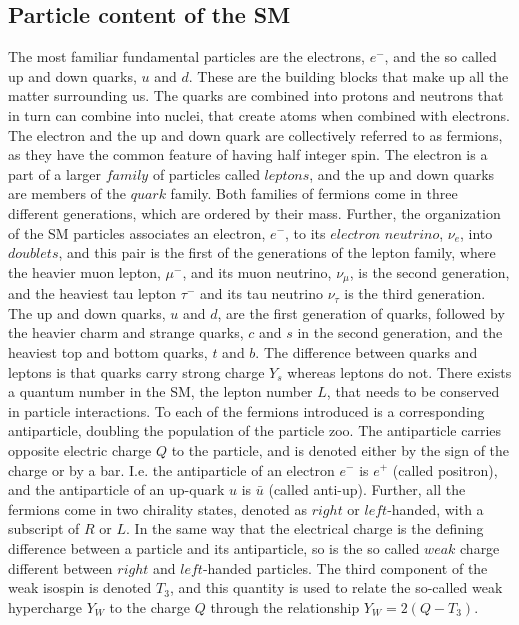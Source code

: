 \subsection*{Particle content of the SM}  
\noindent\justify
The most familiar fundamental particles are the electrons, $e^{-}$, and the so called up and down quarks, $u$ and $d$. 
These are the building blocks that make up all the matter surrounding us. 
The quarks are combined into protons and neutrons that in turn can combine into nuclei, that create atoms when combined with electrons. 
The electron and the up and down quark are collectively referred to as fermions, as they have the common feature of having half integer spin. 
The electron is a part of a larger $family$ of particles called $leptons$, and the up and down quarks are members of the $quark$ family.
Both families of fermions come in three different generations, which are ordered by their mass. 
Further, the organization of the SM particles associates an electron, $e^{-}$, to its $electron$ $neutrino$, $\nu_{e}$, into $doublets$, and this pair is the first of the generations of the lepton family, where the heavier muon lepton, $\mu^{-}$, and its muon neutrino, $\nu_{\mu}$, is the second generation, and the heaviest tau lepton $\tau^{-}$ and its tau neutrino $\nu_{\tau}$ is the third generation.  
The up and down quarks, $u$ and $d$, are the first generation of quarks, followed by the heavier charm and strange quarks, $c$ and $s$ in the second generation, and the heaviest top and bottom quarks, $t$ and $b$. 
The difference between quarks and leptons is that quarks carry strong charge $Y_{s}$ whereas leptons do not.
There exists a quantum number in the SM, the lepton number $L$, that needs to be conserved in particle interactions.
To each of the fermions introduced is a corresponding antiparticle, doubling the population of the particle zoo. 
The antiparticle carries opposite electric charge $Q$ to the particle, and is denoted either by the sign of the charge or by a bar. 
I.e. the antiparticle of an electron $e^{-}$ is $e^{+}$ (called positron), and the antiparticle of an up-quark $u$ is $\bar{u}$ (called anti-up). 
Further, all the fermions come in two chirality states, denoted as $right$ or $left$-handed, with a subscript of $R$ or $L$.
In the same way that the electrical charge is the defining difference between a particle and its antiparticle, so is the so called $weak$ charge different between $right$ and $left$-handed particles. 
The third component of the weak isospin is denoted $T_{3}$, and this quantity is used to relate the so-called weak hypercharge $Y_{W}$ to the charge $Q$ through the relationship $Y_{W}=2(Q-T_{3})$. 
